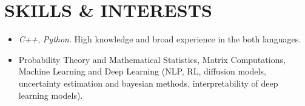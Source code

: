 \section*{SKILLS \& INTERESTS}
\begin{itemize}
	\item \emph{C++}, \emph{Python}. High knowledge and broad experience in the both languages. 
	\item Probability Theory and Mathematical Statistics, Matrix Computations, Machine Learning and Deep Learning (NLP, RL, diffusion models, uncertainty estimation and bayesian methods, interpretability of deep learning models).
\end{itemize}
